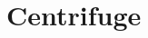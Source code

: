 \chapter{Centrifuge}
\hypertarget{md_code_2centrifuge_2Centrifuge}{}\label{md_code_2centrifuge_2Centrifuge}
